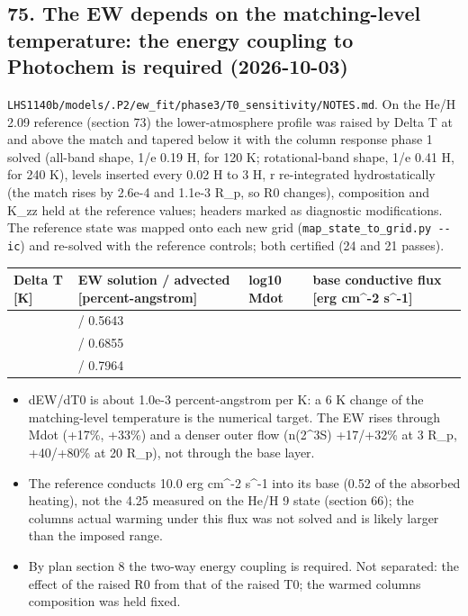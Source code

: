 \documentclass[english,a4paper]{my_memo}
\providecommand{\tightlist}{\setlength{\itemsep}{0pt}\setlength{\parskip}{0pt}}
\begin{document}
\subsection{75. The EW depends on the matching-level temperature: the energy coupling to Photochem is required (2026-10-03)}\label{75-the-ew-depends-on-the-matching-level-temperature-the-energy-coupling-to-photochem-is-required-2026-10-03}

\texttt{LHS1140b/models/.P2/ew\_fit/phase3/T0\_sensitivity/NOTES.md}. On the He/H
2.09 reference (section 73) the lower-atmosphere profile was raised by
Delta T at and above the match and tapered below it with the column
response phase 1 solved (all-band shape, 1/e 0.19 H, for 120 K;
rotational-band shape, 1/e 0.41 H, for 240 K), levels inserted every 0.02 H
to 3 H, r re-integrated hydrostatically (the match rises by 2.6e-4 and
1.1e-3 R\_p, so R0 changes), composition and K\_zz held at the reference
values; headers marked as diagnostic modifications. The reference state
was mapped onto each new grid (\texttt{map\_state\_to\_grid.py\ -\/-ic}) and re-solved
with the reference controls; both certified (24 and 21 passes).

{\def\LTcaptype{none} %
{\small
\begin{longtable}[]{@{}>{\raggedright\arraybackslash}p{\dimexpr(\linewidth-8\tabcolsep)/4\relax}>{\raggedright\arraybackslash}p{\dimexpr(\linewidth-8\tabcolsep)/4\relax}>{\raggedright\arraybackslash}p{\dimexpr(\linewidth-8\tabcolsep)/4\relax}>{\raggedright\arraybackslash}p{\dimexpr(\linewidth-8\tabcolsep)/4\relax}@{}}
\toprule\noalign{}
Delta T {[}K{]} & EW solution / advected {[}percent-angstrom{]} & log10 Mdot & base conductive flux {[}erg cm\^{}-2 s\^{}-1{]} \\
\midrule\noalign{}
\endhead
\bottomrule\noalign{}
\endlastfoot
0 & 0.5793 / 0.5643 & 7.8029 & 10.0 \\
120 & 0.6998 / 0.6855 & 7.8720 & 9.53 \\
240 & 0.8098 / 0.7964 & 7.9261 & 8.43 \\
\end{longtable}
}
}

\begin{itemize}
\tightlist
\item
  dEW/dT0 is about 1.0e-3 percent-angstrom per K: a 6 K change of the
  matching-level temperature is the numerical target. The EW rises through
  Mdot (+17\%, +33\%) and a denser outer flow (n(2\^{}3S) +17/+32\% at 3 R\_p,
  +40/+80\% at 20 R\_p), not through the base layer.
\item
  The reference conducts 10.0 erg cm\^{}-2 s\^{}-1 into its base (0.52 of the
  absorbed heating), not the 4.25 measured on the He/H 9 state (section 66);
  the column\textquotesingle s actual warming under this flux was not solved and is likely
  larger than the imposed range.
\item
  By plan section 8 the two-way energy coupling is required. Not separated:
  the effect of the raised R0 from that of the raised T0; the warmed
  column\textquotesingle s composition was held fixed.
\end{itemize}
\end{document}
